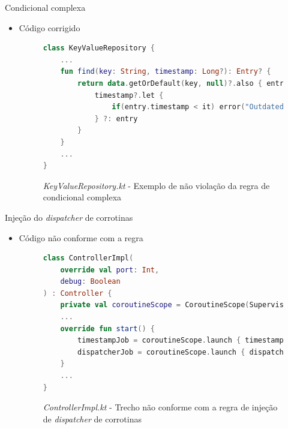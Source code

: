 \documentclass[brazilian]{beamer}
\begin{document}
\begin{frame}[fragile]{Condicional complexa}
    \begin{itemize}
        \item Código corrigido
        \begin{figure}[H]
            \centering
            \begin{lstlisting}[language=Kotlin]
class KeyValueRepository {
    ...
    fun find(key: String, timestamp: Long?): Entry? {
        return data.getOrDefault(key, null)?.also { entry ->
            timestamp?.let {
                if(entry.timestamp < it) error("Outdated entry found!")
            } ?: entry
        }
    }
    ...
}
            \end{lstlisting}
            \caption{\textit{KeyValueRepository.kt} - Exemplo de não violação da regra de condicional complexa}
            \label{fig:detekt_complex_condition_after_example}
        \end{figure}
    \end{itemize}
\end{frame}

\begin{frame}[fragile]{Injeção do \textit{dispatcher} de corrotinas}
    \begin{itemize}
        \item Código não conforme com a regra
        \begin{figure}[H]
            \centering
            \begin{lstlisting}[language=Kotlin]
class ControllerImpl(
    override val port: Int,
    debug: Boolean
) : Controller {
    private val coroutineScope = CoroutineScope(SupervisorJob() + Dispatchers.IO)
    ...
    override fun start() {
        timestampJob = coroutineScope.launch { timestampRepository.run() }
        dispatcherJob = coroutineScope.launch { dispatcher.run() }
    }
    ...
}
            \end{lstlisting}
            \caption{\textit{ControllerImpl.kt} - Trecho não conforme com a regra de injeção de \textit{dispatcher} de corrotinas}
            \label{fig:detekt_inject_dispatcher_before_example}
        \end{figure}
    \end{itemize}
\end{frame}
\end{document}
